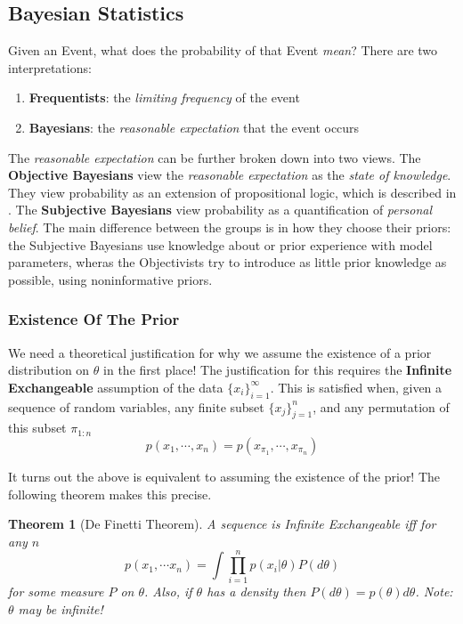 \documentclass[]{article}
\theoremstyle{mattstyle}
\newtheorem{theorem}{Theorem}[section]
\theoremstyle{definition}
\begin{document}
\newpage
\subsection{Bayesian Statistics}

Given an Event, what does the probability of that Event \emph{mean}? There are two interpretations:

\begin{enumerate}
	\item \textbf{Frequentists}: the \emph{limiting frequency} of the event
	\item \textbf{Bayesians}: the \emph{reasonable expectation} that the event occurs
\end{enumerate}

The \emph{reasonable expectation} can be further broken down into two views. The \textbf{Objective Bayesians} view the \emph{reasonable expectation} as the \emph{state of knowledge}. They view probability as an extension of propositional logic, which is described in \cite{jaynes}. The \textbf{Subjective Bayesians} view probability as a quantification of \emph{personal belief}. The main difference between the groups is in how they choose their priors: the Subjective Bayesians use knowledge about or prior experience with model parameters, wheras the Objectivists try to introduce as little prior knowledge as possible, using noninformative priors.

\subsubsection{Existence Of The Prior}
We need a theoretical justification for why we assume the existence of a prior distribution on \(\theta\) in the first place! The justification for this requires the \textbf{Infinite Exchangeable} assumption of the data \(\{x_i\}_{i=1}^{\infty}\). This is satisfied when, given a sequence of random variables, any finite subset \(\{x_j\}_{j=1}^{n}\), and any permutation of this subset \(\pi_{1:n}\) 
\begin{equation}
p(x_1, \cdots, x_n) = p(x_{\pi_1}, \cdots, x_{\pi_n})
\end{equation}

It turns out the above is equivalent to assuming the existence of the prior! The following theorem makes this precise.

\begin{theorem}[De Finetti Theorem]
	A sequence is Infinite Exchangeable iff for any \(n\)
	$$ p(x_1, \cdots x_n) = \int\prod_{i=1}^n p(x_i|\theta)P(d\theta) $$
	for some measure \(P\) on \(\theta\). Also, if $\theta$ has a density then $P(d\theta) = p(\theta)d\theta$. Note: \(\theta\) may be infinite!
\end{theorem}
\end{document}
